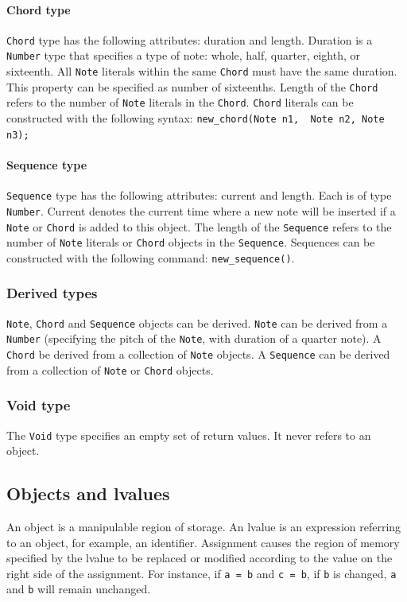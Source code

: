 \documentclass[12pt,A4]{book}
\begin{document}
\paragraph{Chord type}
\verb|Chord| type has the following attributes: duration and length. Duration is a \verb|Number| type that specifies a type of note: whole, half, quarter, eighth, or sixteenth. All \verb|Note| literals within the same \verb|Chord| must have the same duration.  This property can be specified as number of sixteenths. Length of the \verb|Chord| refers to the number of \verb|Note| literals in the \verb|Chord|.
\verb|Chord| literals can be constructed with the following syntax: \verb|new_chord(Note n1,  Note n2, Note n3);|
\paragraph{Sequence type}
\verb|Sequence| type has the following attributes: current and length. Each is of type \verb|Number|. Current denotes the current time where a new note will be inserted if a \verb|Note| or \verb|Chord| is added to this object. The length of the \verb|Sequence| refers to the number of \verb|Note| literals or \verb|Chord| objects in the \verb|Sequence|. Sequences can be constructed with the following command: \verb|new_sequence()|.
\subsubsection{Derived types}
\verb|Note|, \verb|Chord| and \verb|Sequence| objects can be derived. \verb|Note| can be derived from a \verb|Number| (specifying the pitch of the \verb|Note|, with duration of a quarter note). A \verb|Chord| be derived from a collection of \verb|Note| objects. A \verb|Sequence| can be derived from a collection of \verb|Note| or \verb|Chord| objects.
\subsubsection{Void type}
The \verb|Void| type specifies an empty set of return values. It never refers to an object.
\subsection{Objects and lvalues}
An object is a manipulable region of storage. An lvalue is an expression referring to an object, for example, an identifier.  Assignment causes the region of memory specified by the lvalue to be replaced or modified according to the value on the right side of the assignment.  For instance, if \verb|a = b| and \verb|c = b|, if \verb|b| is changed, \verb|a| and \verb|b| will remain unchanged.
\end{document}
